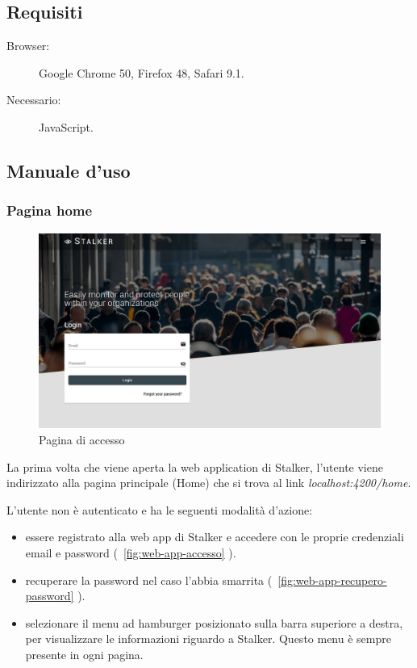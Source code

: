 \documentclass[../manuale-utente.tex]{subfiles}
\begin{document}
\subsection{Requisiti}%
\label{sub:requisiti}

\begin{description}
    \item[Browser:] Google Chrome 50, Firefox 48, Safari 9.1.
    \item[Necessario:] JavaScript.
\end{description}


\subsection{Manuale d'uso}%
\label{sub:manuale-uso-web}

\subsubsection{Pagina home}%
\label{subs:pagina_home}

\begin{figure}[H]
    \centering
    \includegraphics[width=175mm]{img/web-app/pagina-home.png}
    \caption{Pagina di accesso}%
    \label{fig:web_app_pagina_accesso}
\end{figure}

La prima volta che viene aperta la web application di Stalker, l'utente viene indirizzato alla pagina principale (Home) che si trova al link \textit{localhost:4200/home}.

L'utente non è autenticato e ha le seguenti modalità d'azione:
\begin{itemize}
    \item essere registrato alla web app di Stalker e accedere con le proprie credenziali email e password (~\ref{fig:web-app-accesso} ).
    \item recuperare la password nel caso l'abbia smarrita (~\ref{fig:web-app-recupero-password} ).
    \item selezionare il menu ad hamburger posizionato sulla barra superiore a destra, per visualizzare le informazioni riguardo a Stalker. Questo menu è sempre presente in ogni pagina.
\end{itemize} 
\newpage
\end{document}
